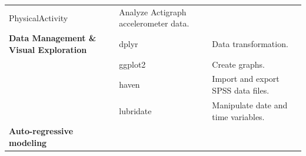 \documentclass[]{book}
\begin{document}
\begin{longtable}[]{@{}lll@{}}
\begin{minipage}[t]{0.23\columnwidth}
PhysicalActivity\strut
\end{minipage} & \begin{minipage}[t]{0.48\columnwidth}\raggedright\strut
Analyze Actigraph accelerometer data.\strut
\end{minipage}\tabularnewline
\begin{minipage}[t]{0.21\columnwidth}\raggedright\strut
\textbf{Data Management \& Visual Exploration}\strut
\end{minipage} & \begin{minipage}[t]{0.23\columnwidth}\raggedright\strut
dplyr\strut
\end{minipage} & \begin{minipage}[t]{0.48\columnwidth}\raggedright\strut
Data transformation.\strut
\end{minipage}\tabularnewline
\begin{minipage}[t]{0.21\columnwidth}\raggedright\strut
\strut
\end{minipage} & \begin{minipage}[t]{0.23\columnwidth}\raggedright\strut
ggplot2\strut
\end{minipage} & \begin{minipage}[t]{0.48\columnwidth}\raggedright\strut
Create graphs.\strut
\end{minipage}\tabularnewline
\begin{minipage}[t]{0.21\columnwidth}\raggedright\strut
\strut
\end{minipage} & \begin{minipage}[t]{0.23\columnwidth}\raggedright\strut
haven\strut
\end{minipage} & \begin{minipage}[t]{0.48\columnwidth}\raggedright\strut
Import and export SPSS data files.\strut
\end{minipage}\tabularnewline
\begin{minipage}[t]{0.21\columnwidth}\raggedright\strut
\strut
\end{minipage} & \begin{minipage}[t]{0.23\columnwidth}\raggedright\strut
lubridate\strut
\end{minipage} & \begin{minipage}[t]{0.48\columnwidth}\raggedright\strut
Manipulate date and time variables.\strut
\end{minipage}\tabularnewline
\begin{minipage}[t]{0.21\columnwidth}\raggedright\strut
\textbf{Auto-regressive modeling}\strut
\end{minipage} & \begin{minipage}[t]{0.23\columnwidth}\raggedright\strut

\end{minipage}
\end{longtable}
\end{document}
